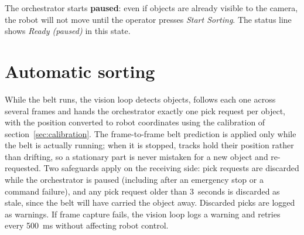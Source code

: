 \begin{notebox}
  The orchestrator starts \textbf{paused}: even if objects are already
  visible to the camera, the robot will not move until the operator
  presses \emph{Start Sorting}. The status line shows
  \emph{Ready (paused)} in this state.
\end{notebox}

\section{Automatic sorting}
%
While the belt runs, the vision loop detects objects, follows each one
across several frames and hands the orchestrator exactly one pick request
per object, with the position converted to robot coordinates using the
calibration of section~\ref{sec:calibration}. The frame-to-frame belt
prediction is applied only while the belt is actually running; when it is
stopped, tracks hold their position rather than drifting, so a stationary
part is never mistaken for a new object and re-requested. Two safeguards apply on the
receiving side: pick requests are discarded while the orchestrator is
paused (including after an emergency stop or a command failure), and any
pick request older than 3~seconds is discarded as stale, since the belt
will have carried the object away. Discarded picks are logged as
warnings. If frame capture fails, the vision loop logs a warning and
retries every 500~ms without affecting robot control.

